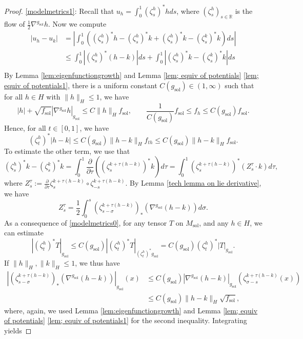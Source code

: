 \documentclass[10pt,a4paper]{amsart}
\providecommand{\sol}{\operatorname{sol}}
\begin{document}
\begin{proof}
\ref{modelmetrics1}:
Recall that $u_h=\int_0^1(\zeta^h_s)^*hds$, where $(\zeta_s^h)_{s\in \mathbb{R}}$ is the flow of $\frac{1}{2}\nabla^{g_{\sol}}h$. Now we compute 
\begin{equation*}
   \begin{split}
        |u_h-u_k|&=\left|\int_0^1\left((\zeta^h_s)^*h-(\zeta^h_s)^*k+(\zeta^h_s)^*k-(\zeta^k_s)^*k\right)ds\right|\\
        &\le \int_0^1|(\zeta^h_s)^*(h-k)|ds+\int_0^1|(\zeta^h_s)^*k-(\zeta^k_s)^*k|ds\\
   \end{split}
\end{equation*}
By Lemma \ref{lem:eigenfunctiongrowth} and Lemma \ref{lem; equiv of potentials} \ref{lem; equiv of potentials1}, there is a uniform constant $C(g_{\sol})\in (1,\infty)$ such that for all $h\in H$ with $\|h\|_H \leq 1$, we have
\begin{equation*}
    |h|+\sqrt{f_{\sol}}|\nabla^{g_{\sol}}h|_{g_{\sol}}\le C\|h\|_{H}f_{\sol},\qquad \frac{1}{C(g_{\sol})}f_{\sol}\le f_h\le C(g_{\sol})f_{\sol}.
\end{equation*}
Hence, for all $t\in[0,1]$, we have
\begin{equation*}
    (\zeta^h_t)^*|h-k|\le C(g_{\sol})\|h-k\|_{H}f_{th}\le C(g_{\sol})\|h-k\|_H f_{\sol}.
\end{equation*}
To estimate the other term, we use that
\begin{equation*}
        (\zeta_s^h)^*k-(\zeta_s^k)^*k=\int_0^1\frac{\partial}{\partial \tau}\left((\zeta^{k+\tau(h-k)}_s)^*k\right)d\tau = \int_0^1 (\zeta^{k+\tau(h-k)}_s)^*(Z^\tau_s\cdot k)d\tau,
\end{equation*}
where $Z_s^{\tau}:=\frac{\partial}{\partial \tau}\zeta^{k+\tau(h-k)}_s\circ\zeta^{k+\tau(h-k)}_{-s}$. By Lemma \ref{tech lemma on lie derivative}, we have
\begin{equation} \label{eq:variation vector field model metrics}
    Z_s^\tau=\frac{1}{2}\int_0^s(\zeta_{s-\sigma}^{k+\tau(h-k)})_*(\nabla^{g_{\sol}}(h-k))d\sigma .
\end{equation}
 As a consequence of \ref{modelmetrics0}, for any tensor $T$ on $M_{\sol}$, and any $h\in H$, we can estimate
\begin{equation} \label{eq:usefuldoodad}
    |(\zeta_t^h)^{\ast}T|_{g_{\sol}}\leq C(g_{\sol}) |(\zeta_t^h)^{\ast}T|_{(\zeta_t^h)^{\ast}g_{\sol}}=C(g_{\sol})(\zeta_t^h)^{\ast}|T|_{g_{\sol}}.
\end{equation}
If $\|h\|_H,\|k\|_H \leq 1$, we thus have
\begin{align*}
    |(\zeta_{s-\sigma}^{k+\tau(h-k)})_{\ast}(\nabla^{g_{\sol}}(h-k))|_{g_{\sol}} (x) &\le C(g_{\sol})|\nabla^{g_{\sol}}(h-k)|_{g_{\sol}}(\zeta_{\sigma-s}^{k+\tau(h-k)}(x))\\
    & \leq C(g_{\sol})\|h-k\|_H \sqrt{f_{\sol}},
\end{align*}
where, again, we used Lemma \ref{lem:eigenfunctiongrowth} and Lemma \ref{lem; equiv of potentials} \ref{lem; equiv of potentials1} for the second inequality. Integrating yields


\end{proof}
\end{document}
